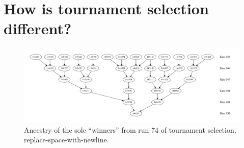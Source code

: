 
\section{How is tournament selection different?}
\label{sec:tournamentRun}


\begin{figure}
	\vspace{0.6\columnwidth}
	\includegraphics[width=\columnwidth]{figures/ancestors_of_winner_rswn_tourney_run74.pdf}
	\caption{Ancestry of the sole ``winners'' from run 74 of tournament selection, 
		replace-space-with-newline.}
	\label{fig:winnerAncestorsTourneyRun74}
\end{figure}

